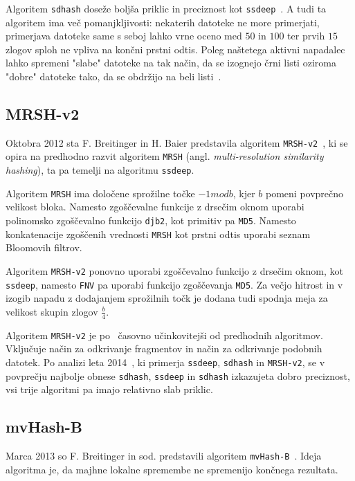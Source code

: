 \documentclass{acm_proc_article-sp}
\begin{document}
Algoritem \texttt{sdhash} doseže boljša priklic in preciznost kot \texttt{ssdeep}~\cite{fbhash}. A tudi ta algoritem ima več pomanjkljivosti: nekaterih datoteke ne more primerjati, primerjava datoteke same s seboj lahko vrne oceno med $50$ in $100$ ter prvih $15$ zlogov sploh ne vpliva na končni prstni odtis. Poleg naštetega aktivni napadalec lahko spremeni "slabe" datoteke na tak način, da se izognejo črni listi oziroma "dobre" datoteke tako, da se obdržijo na beli listi~\cite{breitinger2012security}.

\subsection{MRSH-v2}
Oktobra 2012 sta F. Breitinger in H. Baier predstavila algoritem \texttt{MRSH-v2}~\cite{mrsh-v2}, ki se opira na predhodno razvit algoritem \texttt{MRSH} (angl. \emph{multi-resolution similarity hashing}), ta pa temelji na algoritmu \texttt{ssdeep}. 

Algoritem \texttt{MRSH} ima določene sprožilne točke $-1 mod b$, kjer $b$ pomeni povprečno velikost bloka. Namesto zgoščevalne funkcije z drsečim oknom uporabi polinomsko zgoščevalno funkcijo \texttt{djb2}, kot primitiv pa \texttt{MD5}. Namesto konkatenacije zgoščenih vrednosti \texttt{MRSH} kot prstni odtis uporabi seznam Bloomovih filtrov. 

Algoritem \texttt{MRSH-v2} ponovno uporabi zgoščevalno funkcijo z drsečim oknom, kot \texttt{ssdeep}, namesto \texttt{FNV} pa uporabi funkcijo zgoščevanja \texttt{MD5}. Za večjo hitrost in v izogib napadu z dodajanjem sprožilnih točk je dodana tudi spodnja meja za velikost skupin zlogov $\frac{b}{4}$. 

Algoritem \texttt{MRSH-v2} je po~\cite{mrsh-v2} časovno učinkovitejši od predhodnih algoritmov. Vključuje način za odkrivanje fragmentov in način za odkrivanje podobnih datotek. Po analizi leta 2014~\cite{breitinger2014}, ki primerja \texttt{ssdeep}, \texttt{sdhash} in \texttt{MRSH-v2}, se v povprečju najbolje obnese \texttt{sdhash}, \texttt{ssdeep} in \texttt{sdhash} izkazujeta dobro preciznost, vsi trije algoritmi pa imajo relativno slab priklic.

\subsection{mvHash-B}
Marca 2013 so F. Breitinger in sod. predstavili algoritem \texttt{mvHash-B}~\cite{mvhash-b}. Ideja algoritma je, da majhne lokalne spremembe ne spremenijo končnega rezultata. 
\end{document}
